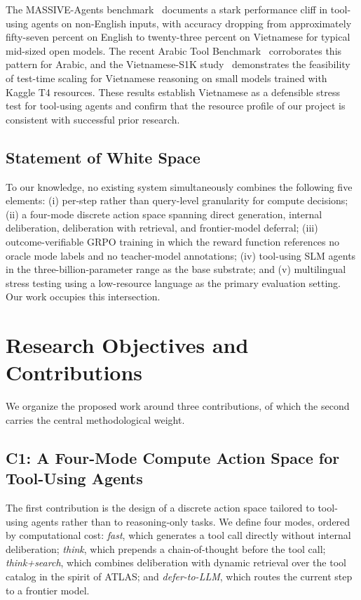 \documentclass[11pt,a4paper]{article}
\begin{document}
The MASSIVE-Agents benchmark~\cite{massive_agents} documents a stark performance cliff in tool-using agents on non-English inputs, with accuracy dropping from approximately fifty-seven percent on English to twenty-three percent on Vietnamese for typical mid-sized open models. The recent Arabic Tool Benchmark~\cite{arabic_tool} corroborates this pattern for Arabic, and the Vietnamese-S1K study~\cite{vi_s1k} demonstrates the feasibility of test-time scaling for Vietnamese reasoning on small models trained with Kaggle T4 resources. These results establish Vietnamese as a defensible stress test for tool-using agents and confirm that the resource profile of our project is consistent with successful prior research.

\subsection{Statement of White Space}

To our knowledge, no existing system simultaneously combines the following five elements: (i) per-step rather than query-level granularity for compute decisions; (ii) a four-mode discrete action space spanning direct generation, internal deliberation, deliberation with retrieval, and frontier-model deferral; (iii) outcome-verifiable GRPO training in which the reward function references no oracle mode labels and no teacher-model annotations; (iv) tool-using SLM agents in the three-billion-parameter range as the base substrate; and (v) multilingual stress testing using a low-resource language as the primary evaluation setting. Our work occupies this intersection.

\section{Research Objectives and Contributions}

We organize the proposed work around three contributions, of which the second carries the central methodological weight.

\subsection{C1: A Four-Mode Compute Action Space for Tool-Using Agents}

The first contribution is the design of a discrete action space tailored to tool-using agents rather than to reasoning-only tasks. We define four modes, ordered by computational cost: \textit{fast}, which generates a tool call directly without internal deliberation; \textit{think}, which prepends a chain-of-thought before the tool call; \textit{think+search}, which combines deliberation with dynamic retrieval over the tool catalog in the spirit of ATLAS; and \textit{defer-to-LLM}, which routes the current step to a frontier model.
\end{document}
